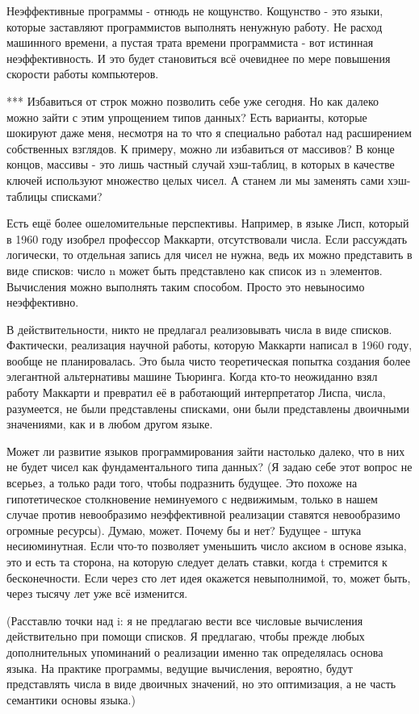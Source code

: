 \documentclass[ebook,12pt,oneside,openany]{memoir}
\begin{document}
Неэффективные программы - отнюдь не кощунство. Кощунство - это языки,
которые заставляют программистов выполнять ненужную работу. Не расход
машинного времени, а пустая трата времени программиста - вот истинная
неэффективность. И это будет становиться всё очевиднее по мере
повышения скорости работы компьютеров.

*** Избавиться от строк можно позволить себе уже сегодня. Но как
далеко можно зайти с этим упрощением типов данных? Есть варианты,
которые шокируют даже меня, несмотря на то что я специально работал
над расширением собственных взглядов. К примеру, можно ли избавиться
от массивов? В конце концов, массивы - это лишь частный случай
хэш-таблиц, в которых в качестве ключей используют множество целых
чисел. А станем ли мы заменять сами хэш-таблицы списками?

Есть ещё более ошеломительные перспективы. Например, в языке Лисп,
который в 1960 году изобрел профессор Маккарти, отсутствовали числа.
Если рассуждать логически, то отдельная запись для чисел не нужна,
ведь их можно представить в виде списков: число n может быть
представлено как список из n элементов. Вычисления можно выполнять
таким способом. Просто это невыносимо неэффективно.

В действительности, никто не предлагал реализовывать числа в виде
списков. Фактически, реализация научной работы, которую Маккарти
написал в 1960 году, вообще не планировалась. Это была чисто
теоретическая попытка создания более элегантной альтернативы машине
Тьюринга. Когда кто-то неожиданно взял работу Маккарти и превратил её
в работающий интерпретатор Лиспа, числа, разумеется, не были
представлены списками, они были представлены двоичными значениями, как
и в любом другом языке.

Может ли развитие языков программирования зайти настолько далеко, что
в них не будет чисел как фундаментального типа данных? (Я задаю себе
этот вопрос не всерьез, а только ради того, чтобы подразнить будущее.
Это похоже на гипотетическое столкновение неминуемого с недвижимым,
только в нашем случае против невообразимо неэффективной реализации
ставятся невообразимо огромные ресурсы). Думаю, может. Почему бы и
нет? Будущее - штука несиюминутная. Если что-то позволяет уменьшить
число аксиом в основе языка, это и есть та сторона, на которую следует
делать ставки, когда t стремится к бесконечности. Если через сто лет
идея окажется невыполнимой, то, может быть, через тысячу лет уже всё
изменится.

(Расставлю точки над i: я не предлагаю вести все числовые вычисления
действительно при помощи списков. Я предлагаю, чтобы прежде любых
дополнительных упоминаний о реализации именно так определялась основа
языка. На практике программы, ведущие вычисления, вероятно, будут
представлять числа в виде двоичных значений, но это оптимизация, а не
часть семантики основы языка.)
\end{document}

